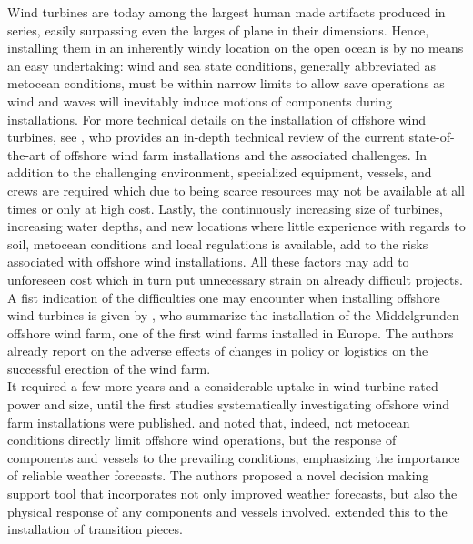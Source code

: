 \documentclass[wes, manuscript]{copernicus}
\begin{document}
Wind turbines are today among the largest human made artifacts produced in series, easily surpassing even the larges of plane in their dimensions. Hence, installing them in an inherently windy location on the open ocean 
is by no means an easy undertaking: wind and sea state conditions, generally abbreviated as metocean conditions, must be within narrow limits to allow save operations as wind and waves will inevitably induce motions of components during installations. For more technical details on the installation of offshore wind turbines, see \citet{jiang_installation_2021}, who provides an in-depth technical review of the current state-of-the-art
of offshore wind farm installations and the associated challenges.
In addition to the challenging environment, specialized equipment, vessels, and crews are required
which due to being scarce resources may not be available at all times or only at high
cost. Lastly, the continuously increasing size of turbines, increasing water depths, and new locations 
where little experience with regards to soil, metocean conditions and local regulations is available, add to 
the risks associated with offshore wind installations. All these factors may add to unforeseen cost which in turn 
put unnecessary strain on already difficult projects.\\
A fist indication of the difficulties one may encounter when installing offshore wind turbines is given by \citet{sorensen_experience_2001}, who summarize the installation of the Middelgrunden offshore wind farm, one of the
first wind farms installed in Europe. The authors already report on the adverse effects of changes in policy or logistics on the successful erection of the wind farm.\\
It required a few more years and a considerable uptake in wind turbine rated power and size, 
until the first studies systematically investigating offshore wind farm installations were published. 
\citet{gintautas_towards_2016} and \citet{gintautas_improved_2017} noted that, indeed, not metocean conditions directly limit offshore wind operations, but the response of components and vessels to the prevailing conditions, emphasizing the importance of reliable weather forecasts. The authors proposed a novel decision making support tool that incorporates not only improved weather forecasts, but also the physical response of any components and vessels involved. \citet{acero_methodology_2017} extended this to the installation of transition pieces. \\
\end{document}

